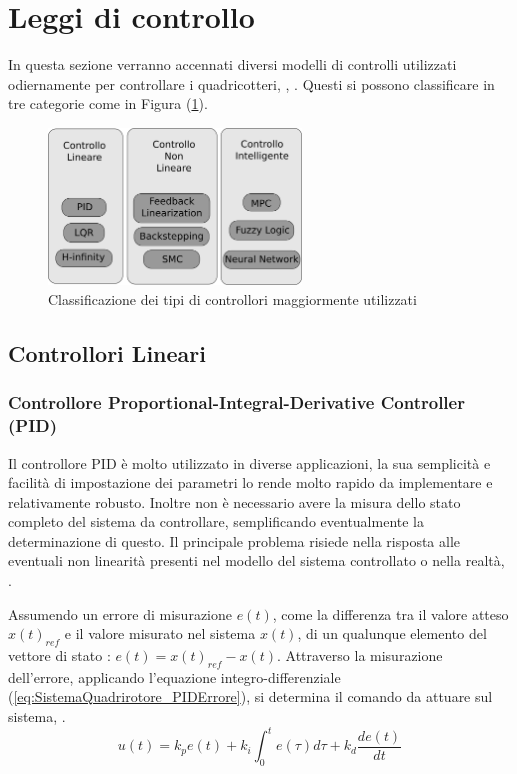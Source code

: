 \section{Leggi di controllo}
In questa sezione verranno accennati diversi modelli di controlli utilizzati odiernamente per controllare i quadricotteri, \cite{ZuluAndrew2014ARoC}, \cite{KimJinho2020ACSo}. Questi si possono classificare in tre categorie come in Figura (\ref{fig:categoriecontrolli}).
\begin{figure}
	\centering
	\includegraphics[width=0.6\textwidth]{SistemaQuadrirotore/Figure/Classificazione}
	\caption{Classificazione dei tipi di controllori maggiormente utilizzati \cite{KimJinho2020ACSo}}
	\label{fig:categoriecontrolli}
\end{figure}


\subsection{Controllori Lineari}
\subsubsection{Controllore Proportional-Integral-Derivative Controller (PID)}
Il controllore PID è molto utilizzato in diverse applicazioni, la sua semplicità e facilità di impostazione dei parametri lo rende molto rapido da implementare e relativamente robusto. Inoltre non è necessario avere la misura dello stato completo del sistema da controllare, semplificando eventualmente la determinazione di questo. Il principale problema risiede nella risposta alle eventuali non linearità presenti nel modello del sistema controllato o nella realtà, \cite{KimJinho2020ACSo}.

Assumendo un errore di misurazione $e(t)$, come la differenza tra il valore atteso $x(t)_{ref}$ e il valore misurato nel sistema $x(t)$, di un qualunque elemento del vettore di stato : $e(t)=x(t)_{ref}-x(t)$. Attraverso la misurazione dell'errore, applicando l'equazione integro-differenziale (\ref{eq:SistemaQuadrirotore_PIDErrore}), si determina il comando da attuare sul sistema, \cite{advanced-pid-control}.
\begin{equation}\label{eq:SistemaQuadrirotore_PIDErrore}
	u(t) = k_p e(t) + k_i \int_0^t e(\tau) d\tau + k_d \frac{d e(t)}{d t}
\end{equation}

